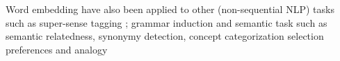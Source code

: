 Word embedding have also been applied to other (non-sequential NLP) tasks such as super-sense tagging \cite{Grave:2013}; grammar induction \cite{Spitkovsky:2011} and semantic task such as semantic relatedness, synonymy detection, concept categorization selection preferences and analogy \cite{baroni:2014}




